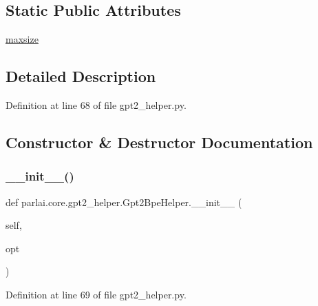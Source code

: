 \subsection*{Static Public Attributes}
\begin{DoxyCompactItemize}
\item 
\hyperlink{classparlai_1_1core_1_1gpt2__helper_1_1Gpt2BpeHelper_a5a4b144481c4d3fe318ac52c4bee0611}{maxsize}
\end{DoxyCompactItemize}


\subsection{Detailed Description}


Definition at line 68 of file gpt2\+\_\+helper.\+py.



\subsection{Constructor \& Destructor Documentation}
\mbox{\label{classparlai_1_1core_1_1gpt2__helper_1_1Gpt2BpeHelper_a840a966672e91e86b92e94818655d283}} 
\subsubsection{\texorpdfstring{\+\_\+\+\_\+init\+\_\+\+\_\+()}{\_\_init\_\_()}}
{\footnotesize\ttfamily def parlai.\+core.\+gpt2\+\_\+helper.\+Gpt2\+Bpe\+Helper.\+\_\+\+\_\+init\+\_\+\+\_\+ (\begin{DoxyParamCaption}\item[{}]{self,  }\item[{}]{opt }\end{DoxyParamCaption})}



Definition at line 69 of file gpt2\+\_\+helper.\+py.


